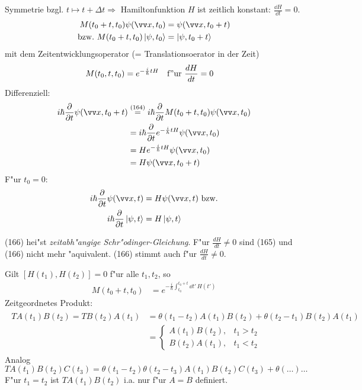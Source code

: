 \documentclass[a4paper]{scrartcl}
\begin{document}
{Symmetrie bzgl. $t \mapsto t + \Delta t \Longrightarrow$ Hamiltonfunktion $H$ ist zeitlich konstant: $\frac { \dd H }{\dd t} = 0$.
\begin{align}
\begin{split}
M(t_0+t, t_0) \psi(\vv x, t_0) & = \psi(\vv x, t_0 + t) \\
\mathrm{bzw. \ } M(t_0 + t, t_0) \ket{ \psi, t_0} & = \ket{ \psi, t_0+t}
\end{split}
\end{align}
mit dem Zeitentwicklungsoperator (= Translationsoerator in der Zeit)
\begin{align}
M(t_0,t, t_0) & = e^{- \frac i \hbar t H} \quad \mathrm{f"ur \ } \frac{d H}{dt} = 0
\end{align}
Differenziell:
\begin{align*}
i \hbar \frac \partial {\partial t} \psi(\vv x, t_0 + t) & \stackrel{(164)}= i \hbar \frac \partial {\partial t} M(t_0+t, t_0) \psi(\vv x, t_0) \\
& = i \hbar \frac \partial {\partial t} e^{-\frac i \hbar t H} \psi( \vv x, t_0) \\
& = H e^{-\frac i \hbar t H} \psi(\vv x, t_0) \\
& = H \psi(\vv x, t_0 + t)
\end{align*}
F"ur $t_0 =0$:
\begin{align}
\begin{split}
i \hbar \frac \partial {\partial t} \psi(\vv x, t) & = H \psi( \vv x, t) \ \mathrm{bzw.} \\
i \hbar \frac \partial {\partial t} \ket{ \psi, t} & = H \ket{ \psi, t}
\end{split}
\end{align}

(166) hei"st \emph{zeitabh"angige Schr"odinger-Gleichung}. F"ur $\frac {dH}{dt} \neq 0$ sind (165) und (166) nicht mehr "aquivalent. (166) stimmt auch f"ur $\frac{dH}{dt} \neq 0$.

Gilt $[ H(t_1), H(t_2) ] = 0$ f"ur alle $t_1, t_2$, so 
\begin{align}
M(t_0+t, t_0) & = e^{-\frac i \hbar \int_{t_0}^{t_0+ t} \dd t' \, H(t')}
\end{align}
Zeitgeordnetes Produkt:
\begin{align}
\begin{split}
T A(t_1) B(t_2) = T B(t_2) A(t_1) & = \theta (t_1 - t_2) A(t_1) B(t_2) + \theta(t_2-t_1) B(t_2) A(t_1) \\
& = \begin{cases} A(t_1) B(t_2), & t_1 > t_2 \\
B(t_2) A(t_1), & t_1 < t_2 \end{cases}
\end{split}
\end{align}
Analog $T A(t_1) B(t_2) C(t_3) = \theta(t_1 - t_2) \theta(t_2 - t_3) A(t_1) B(t_2) C(t_3) + \theta(\ldots) \ldots$
F"ur $t_1 = t_2$ ist $T A(t_1) B(t_2)$ i.a. nur f"ur $A=B$ definiert.


}
\end{document}
